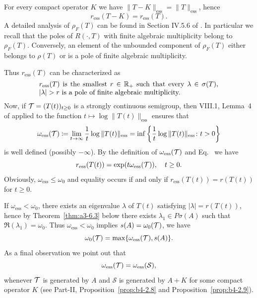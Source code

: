 \begin{example}
For every compact operator $K$ we have $\|T - K\|_{\text{ess}} = \|T\|_{\text{ess}}$, hence
\begin{equation}\label{eq:a3-3.7}
r_{\text{ess}}(T - K) = r_{\text{ess}}(T) .
\end{equation}
A detailed analysis of\/ $\rho_{F}(T)$ can be found in Section IV.5.6 of \textcite{kato:1976}.
In particular we recall that the poles 
of\/ $R(\cdot,T)$ with finite algebraic multiplicity belong to $\rho_{F}(T)$.
Conversely, an element of the unbounded component of\/ $\rho_{F}(T)$ either belongs to $\rho(T)$ or is a pole of finite algebraic multiplicity.

Thus $r_{\text{ess}}(T)$ can be characterized as
\begin{equation}\label{eq:a3-3.8}
\begin{minipage}{.75\textwidth}
$r_{\text{ess}}(T) $ is the smallest   $r \in \R_{+}$    such that every   
$\lambda \in \sigma(T)$, $ |\lambda| > r $  is a pole of finite algebraic multiplicity. 
\end{minipage}
\end{equation}
Now, if\/ $\TT = (T(t))_{t \geq 0}$ is a strongly continuous semigroup, then VIII.1, Lemma~4 of \textcite{dunfordschwartz:1958} applied to the function $t \mapsto \log \|T(t)\|_{\text{ess}}$ ensures that
\begin{equation}\label{eq:a3-3.9}
\omega_{\text{ess}}(\mathcal{T}) \coloneq \lim_{t \to \infty} \frac{1}{t} \log\|T(t)\|_{\text{ess}} = \inf \left\{\frac{1}{t} \log\|T(t)\|_{\text{ess}} \colon t > 0\right\}
\end{equation}
is well defined (possibly $-\infty$).
By the definition of\/ $\omega_{\text{ess}}(\mathcal{T})$ and Eq.~ we have
\begin{equation}\label{eq:a3-3.10}
r_{\text{ess}}(T(t)) = \exp(t\omega_{\text{ess}}(\TT)), \quad t \geq 0 .
\end{equation}
Obviously, $\omega_{\text{ess}} \leq \omega_{0}$ and equality occurs if and only if\/ $r_{\text{ess}}(T(t)) = r(T(t))$ for $t \geq 0$.

If\/ $\omega_{\text{ess}} < \omega_{0}$, there exists an eigenvalue $\lambda$ of\/ $T(t)$ satisfying $|\lambda| = r(T(t))$, hence by Theorem~\ref{thm:a3-6.3} below there exists $\lambda_{1} \in P\sigma(A)$ such that $\Re(\lambda_{1}) = \omega_{0}$.
Thus $\omega_{\text{ess}} < \omega_{0}$ implies $s(A) = \omega_{0}(\mathcal{T})$, \ie we have
\begin{equation}\label{eq:a3-3.11}
\omega_{0}(\mathcal{T}) = \max\{\omega_{\text{ess}}(\mathcal{T}),s(A)\} .
\end{equation}
As a final observation we point out that
\begin{equation}\label{eq:a3-3.12}
\omega_{\text{ess}}(\mathcal{T}) = \omega_{\text{ess}}({\mathcal{S}}) ,
\end{equation}
whenever $\mathcal{T}$ is generated by $A$ and $\mathcal{S}$ is generated by $A + K$ for some compact operator $K$ 
(see Part-II, Proposition~\ref{prop:b4-2.8} and Proposition~\ref{prop:b4-2.9}).
\end{example}

